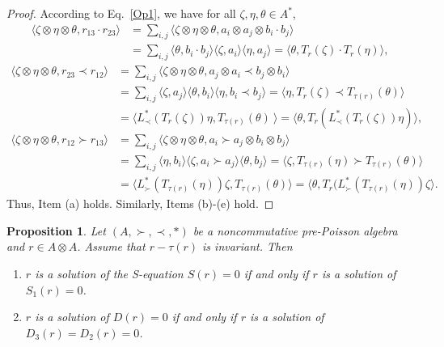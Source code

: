 \documentclass[12pt]{amsart}
\newtheorem{pro}[thm]{Proposition}
\theoremstyle{definition}
\begin{document}
\begin{proof} According to Eq.~\eqref{Op1}, we have for all $\zeta,\eta,\theta\in A^{*}$, 
\begin{align*}\langle \zeta\otimes \eta\otimes \theta,r_{13}\cdot r_{23}\rangle
&=\sum_{i,j}\langle \zeta\otimes \eta\otimes \theta,a_i\otimes a_j \otimes b_i\cdot  b_j\rangle
\\&=\sum_{i,j}\langle \theta,b_i\cdot b_j\rangle\langle \zeta,a_i\rangle \langle \eta,a_j\rangle 
=\langle \theta,T_{r}(\zeta)\cdot T_{r}(\eta) \rangle
,\end{align*}
\begin{align*}\langle \zeta\otimes \eta\otimes \theta,r_{23}\prec r_{12}\rangle
&=\sum_{i,j}\langle \zeta\otimes \eta\otimes \theta,a_j \otimes a_i\prec b_j\otimes b_i\rangle
\\&=\sum_{i,j}\langle \zeta,a_j\rangle\langle \theta,b_i\rangle \langle \eta,b_i\prec b_j\rangle 
=\langle  \eta,T_{r}(\zeta) \prec T_{\tau(r)}(\theta)\rangle
\\&=\langle  L_{\prec}^{*}(T_{r}(\zeta))\eta,T_{\tau(r)}(\theta)\ \rangle
=\langle \theta, T_{r}(L_{\prec}^{*}(T_{r}(\zeta))\eta) \rangle,\end{align*}
 \begin{align*}\langle \zeta\otimes \eta\otimes \theta,r_{12}\succ r_{13}
  \rangle
 &=\sum_{i,j}\langle \zeta\otimes \eta\otimes \theta,a_i \succ a_j\otimes b_i\otimes b_j\rangle
 \\& =\sum_{i,j}\langle \eta,b_i\rangle\langle \zeta,a_i\succ a_j\rangle \langle \theta,b_j\rangle 
 =\langle \zeta,T_{\tau(r)}(\eta)\succ T_{\tau(r)}(\theta) \rangle
  \\&=\langle L_{\succ}^{*}(T_{\tau(r)}(\eta))\zeta,T_{\tau(r)}(\theta)\rangle
 =\langle \theta,T_{r}(L_{\succ}^{*}(T_{\tau(r)}(\eta))\zeta\rangle.\end{align*}
 Thus, Item (a) holds.
Similarly, Items (b)-(e) hold.\end{proof}

\begin{pro}\label{Ya2} Let $(A,\succ,\prec,\ast)$ be a noncommutative pre-Poisson algebra and
$r\in A\otimes A$. Assume that $r-\tau(r)$ is invariant. Then 
\begin{enumerate}
 \item $r$ is a solution of the
S-equation $S(r)=0$ if and only if 
$r$ is a solution of $S_1(r)=0$.
\item $r$ is a solution of $D(r)=0$ if and only if 
$r$ is a solution of $D_3(r)=D_2(r)=0$.
\end{enumerate}
\end{pro} 
\end{document}
